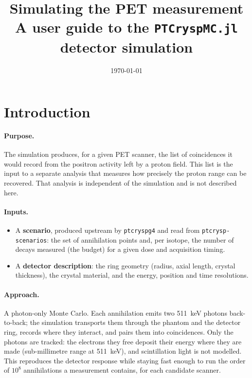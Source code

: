 \documentclass[11pt]{article}
\title{Simulating the PET measurement\\
\large A user guide to the \texttt{PTCryspMC.jl} detector simulation}
\author{}
\date{\today}
\begin{document}
\maketitle

\section{Introduction}
\label{sec:intro}

\paragraph{Purpose.}
The simulation produces, for a given PET scanner, the list of coincidences it would
record from the positron activity left by a proton field. This list is the input to a
separate analysis that measures how precisely the proton range can be recovered. That
analysis is independent of the simulation and is not described here.

\paragraph{Inputs.}
\begin{itemize}[nosep]
\item A \textbf{scenario}, produced upstream by \texttt{ptcryspg4} and read from
\texttt{ptcrysp-scenarios}: the set of annihilation points and, per isotope, the number
of decays measured (the budget) for a given dose and acquisition timing.
\item A \textbf{detector description}: the ring geometry (radius, axial length, crystal
thickness), the crystal material, and the energy, position and time resolutions.
\end{itemize}

\paragraph{Approach.}
A photon-only Monte Carlo. Each annihilation emits two \SI{511}{keV} photons
back-to-back; the simulation transports them through the phantom and the detector ring,
records where they interact, and pairs them into coincidences. Only the photons are
tracked: the electrons they free deposit their energy where they are made (sub-millimetre
range at \SI{511}{keV}), and scintillation light is not modelled. This reproduces the
detector response while staying fast enough to run the order of $10^{8}$ annihilations a
measurement contains, for each candidate scanner.
\end{document}
